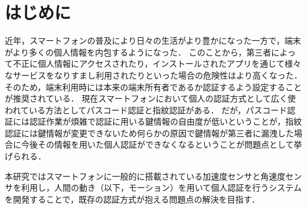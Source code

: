 \section{はじめに}
近年，スマートフォンの普及により日々の生活がより豊かになった一方で，端末がより多くの個人情報を内包するようになった．
このことから，第三者によって不正に個人情報にアクセスされたり，インストールされたアプリを通じて様々なサービスをなりすまし利用されたりといった場合の危険性はより高くなった．
そのため，端末利用時には本来の端末所有者であるか認証するよう設定することが推奨されている．
現在スマートフォンにおいて個人の認証方式として広く使われている方法としてパスコード認証と指紋認証がある．
だが，パスコード認証には認証作業が煩雑で認証に用いる鍵情報の自由度が低いということが，指紋認証には鍵情報が変更できないため何らかの原因で鍵情報が第三者に漏洩した場合に今後その情報を用いた個人認証ができなくなるということが問題点として挙げられる．

本研究ではスマートフォンに一般的に搭載されている加速度センサと角速度センサを利用し，人間の動き（以下，モーション）を用いて個人認証を行うシステムを開発することで，既存の認証方式が抱える問題点の解決を目指す．
